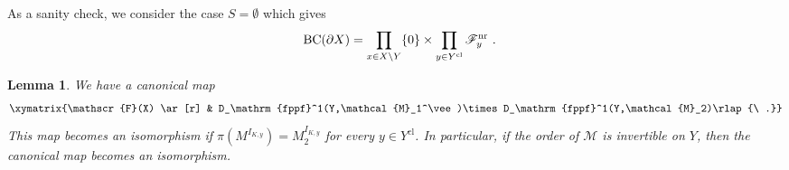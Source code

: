 \documentclass[a4paper]{amsart}
\newtheorem{lem}[thm]{Lemma}
\theoremstyle{definition}
\numberwithin{equation}{section}
\begin{document}
As a sanity check, we consider the case $S=\emptyset$ which gives
\begin{align*}
    \mathrm{BC}(\partial X)=\prod_{x\in X\setminus Y}\{0\}\times\prod_{y\in Y^\mathrm{cl}}\mathscr{F}_y^\mathrm{nr}\rlap{\ .}
\end{align*}
\begin{lem}\label{FX} We have a canonical map
\begin{align}\label{FX-to-D1D1}
    \xymatrix{\mathscr{F}(X) \ar[r] & D_\mathrm{fppf}^1(Y,\mathcal{M}_1^\vee)\times D_\mathrm{fppf}^1(Y,\mathcal{M}_2)\rlap{\ .}}
\end{align}
This map becomes an isomorphism if $\pi(M^{I_{K,y}})=M_2^{I_{K,y}}$ for every $y\in Y^\mathrm{cl}$. In particular, if the order of $\mathcal{M}$ is invertible on $Y$, then the canonical map becomes an isomorphism.
\end{lem}
\end{document}
